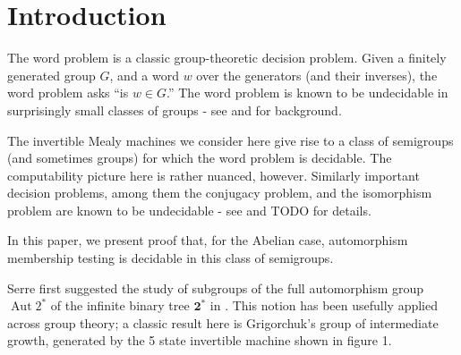\documentclass[11pt, titlepage]{article}
\begin{document}
\pagestyle{plain}
\title{\rmfamily\normalfont{}} \author{} \date{May 5, 2017}

\maketitle

\begin{abstract}
  We consider a variety of decision problems in groups and semigroups
  induced by invertible Mealy machines. Notably, we present proof
  that, in the Abelian case, the automorphism membership problem is
  decidable in these semigroups. In addition, we prove the
  undecidability of a Knapsack variant. A discussion of iteration and
  orbit rationality follows.
\end{abstract}

\tableofcontents

\section{Introduction}
The word problem is a classic group-theoretic decision problem. Given
a finitely generated group $G$, and a word $w$ over the generators
(and their inverses), the word problem asks ``is $w \in G$.'' The word
problem is known to be undecidable in surprisingly small classes of
groups - see \cite{Cain09:auto_sg} and \cite{Cain09:dec_prob} for background.

The invertible Mealy machines we consider here give rise to a class of
semigroups (and sometimes groups) for which the word problem is
decidable. The computability picture here is rather nuanced,
however. Similarly important decision problems, among them the
conjugacy problem, and the isomorphism problem are known to be
undecidable - see \cite{sunic:conj} and TODO for details.

In this paper, we present proof that, for the Abelian case,
automorphism membership testing is decidable in this class of
semigroups.

Serre first suggested the study of subgroups of the full automorphism
group $\operatorname{Aut}2^*$ of the infinite binary tree
$\textbf{2}^*$ in \cite{Serre:old}.  This notion has been usefully
applied across group theory; a classic result here is Grigorchuk's
group of intermediate growth, generated by the 5 state invertible
machine shown in figure 1.
\end{document}
